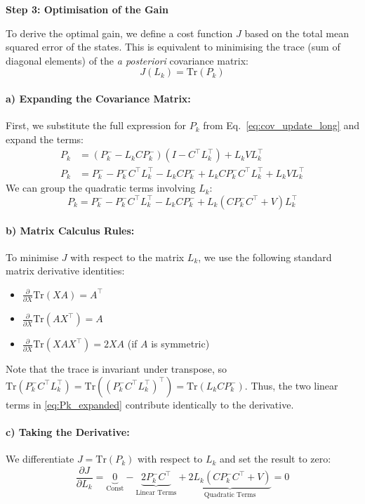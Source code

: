 \textbf{Step 3: Optimisation of the Gain}

To derive the optimal gain, we define a cost function $J$ based on the total mean squared error of the states. This is equivalent to minimising the trace (sum of diagonal elements) of the \textit{a posteriori} covariance matrix:
\begin{equation*}
	J(L_k) = \mathrm{Tr}(P_k)
\end{equation*}

\paragraph{a) Expanding the Covariance Matrix:}
First, we substitute the full expression for $P_k$ from Eq.~\eqref{eq:cov_update_long} and expand the terms:
\begin{align*}
	P_k &= (P_k^- - L_k C P_k^-)(I - C^\top  L_k^\top) + L_k V L_k^\top \nonumber \\
	P_k &= P_k^- - P_k^- C^\top L_k^\top - L_k C P_k^- + L_k C P_k^- C^\top L_k^\top+ L_k V L_k^\top
\end{align*}
We can group the quadratic terms involving $L_k$:
\begin{equation} \label{eq:Pk_expanded}
	P_k = P_k^- - P_k^- C^\top L_k^\top - L_k C P_k^- + L_k (C P_k^- C^\top + V) L_k^\top
\end{equation}

\paragraph{b) Matrix Calculus Rules:}
To minimise $J$ with respect to the matrix $L_k$, we use the following standard matrix derivative identities:
\begin{itemize}
	\item $\frac{\partial}{\partial X} \mathrm{Tr}(X A) = A^\top $
	\item $\frac{\partial}{\partial X} \mathrm{Tr}(A X^\top ) = A$
	\item $\frac{\partial}{\partial X} \mathrm{Tr}(X A X^\top) = 2 X A$ (if $A$ is symmetric)
\end{itemize}
Note that the trace is invariant under transpose, so $\mathrm{Tr}(P_k^- C^\top  L_k^\top) = \mathrm{Tr}((P_k^- C^\top L_k^\top)^\top) = \mathrm{Tr}(L_k C P_k^-)$. Thus, the two linear terms in \eqref{eq:Pk_expanded} contribute identically to the derivative.

\paragraph{c) Taking the Derivative:}
We differentiate $J = \mathrm{Tr}(P_k)$ with respect to $L_k$ and set the result to zero:
\begin{equation*}
	\frac{\partial J}{\partial L_k} = \underbrace{0}_{\text{Const}} - \underbrace{2 P_k^- C^\top}_{\text{Linear Terms}} + \underbrace{2 L_k (C P_k^- C^\top + V)}_{\text{Quadratic Terms}} = 0
\end{equation*}

